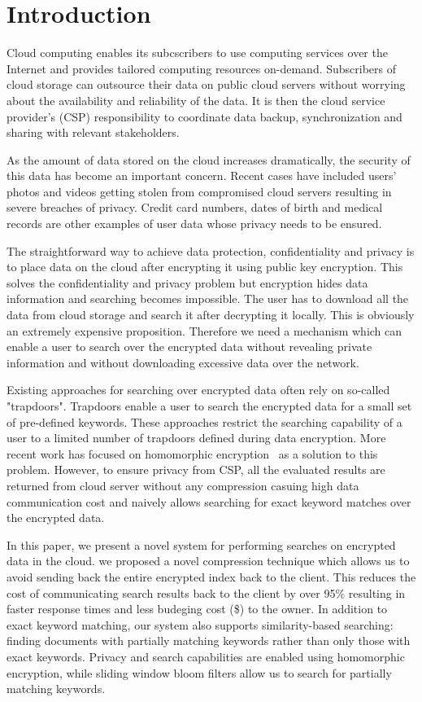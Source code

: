 \section{Introduction}

Cloud computing enables its subcscribers to use computing services over the 
Internet and provides tailored computing resources on-demand. 
Subscribers of cloud storage can outsource their data on public cloud servers
without worrying about the availability and
reliability of the data. It is then the cloud service provider's (CSP) 
responsibility to coordinate data backup, synchronization and sharing
with relevant stakeholders. 

As the amount of data stored on the cloud increases dramatically, the security 
of this data has become an important concern. Recent cases have included users'
photos and videos getting stolen from compromised cloud servers resulting in
severe breaches of privacy. Credit card numbers, dates of birth and medical
records are other examples of user data whose privacy needs to be ensured.

The straightforward way to achieve data protection, confidentiality and privacy is to place data on the cloud after encrypting it using public key encryption. 
This solves the confidentiality and privacy problem
but encryption hides data information and searching becomes impossible. The user has to download all
the data from cloud storage and search it after decrypting it locally. This is
obviously an extremely expensive proposition. Therefore we need a mechanism 
which can enable a user to search over the encrypted data without revealing 
private information and without downloading excessive data over the network.

Existing approaches for searching over encrypted data often rely on so-called
"trapdoors". Trapdoors enable a user to search the encrypted data for a small 
set of pre-defined keywords. These approaches restrict the searching
capability of a user to a limited number of trapdoors defined during data 
encryption. More recent work has focused on homomorphic encryption~\cite{craig} as a solution
to this problem. However, to ensure privacy from CSP, all the evaluated results are returned from cloud server without any compression casuing high data communication cost and naively allows searching for exact keyword matches over the encrypted data. 

In this paper, we present a novel system for performing searches on encrypted 
data in the cloud. we proposed a novel compression technique which allows us to avoid sending back the
entire encrypted index back to the client. This reduces the cost of
communicating search results back to the client by over 95\% resulting in 
faster response times and less budeging cost (\$) to the owner. In addition to exact keyword matching, our system also
supports similarity-based searching: finding documents with partially matching 
keywords rather than only those with exact keywords. Privacy and search 
capabilities are enabled using homomorphic encryption, while sliding window 
bloom filters allow us to search for partially matching keywords. 

